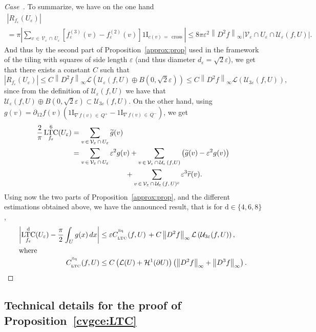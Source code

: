 \documentclass[10pt]{amsart}
\theoremstyle{definition}\newtheorem{defi}[theo]{Definition}\newtheorem{rema}[theo]{Remark}\newtheorem{exam}[theo]{Example}\newtheorem{exem}[theo]{Example}\newtheorem{nota}[theo]{Notation}
\newcommand{\ind}{{1\!\!\mathrm{I}}}
\newcommand{\eps}{\varepsilon}
\DeclareMathOperator{\LTC}{LTC}
\newcommand{\dd}{\mathrm{d}}
\DeclareMathOperator{\Sq}{Sq}
\DeclareMathOperator{\cross}{cross}
\newcommand{\calH}{\mathcal{H}}
\newcommand{\calL}{\mathcal{L}}
\newcommand{\calV}{\mathcal{V}}
\newcommand{\calU}{\mathcal{U}}
\newcounter{casecount}
\newenvironment{lastcase}{\refstepcounter{casecount}\begin{proof}[Case~\thecasecount]}{\end{proof}}
\let\oldtilde\tilde
\renewcommand*{\tilde}[1]{\mathchoice{\widetilde{#1}}{\widetilde{#1}}{\oldtilde{#1}}{\oldtilde{#1}}}
\begin{document}
\begin{lastcase}
To summarize, we have on the one hand
\begin{multline*}
\left| R_{f_\eps}(U_\eps)\right|\\
= \pi \left| \sum_{v\,\in\,\calV_\eps\,\cap\,U_\eps}
\left[f_\eps^{(3)}(v) - f_\eps^{(2)}(v)\right] \ind_{c(v)\,=\,\cross} \right| \leq 8 \pi \eps^2 \left\|D^2 f\right\|_\infty \left| \calV_\eps\cap U_\eps\cap\calU_{\eps}(f,U) \right|.
\end{multline*}
And thus by the second part of Proposition~\ref{approx:prop} used in the framework of the tiling with squares of side length $\eps$ (and thus diameter $d_\eps=\sqrt{2}\eps$), we get that there exists a constant $C$ such that
\[
\left| R_{f_\eps}(U_\eps) \right|\leq C \left\|D^2 f\right\|_\infty \calL \left(\calU_{\eps}(f,U) \oplus B\left(0,\sqrt{2}\eps\right)\right) \leq C \left\|D^2 f\right\|_\infty
\calL \left(\calU_{3\eps}(f,U)\right),
\]
since from the definition of $\calU_{\eps}(f,U)$ we have that $\calU_{\eps}(f,U) \oplus B(0,\sqrt{2}\eps) \subset \calU_{3\eps}(f,U)$. On the other hand, using $g(v)=\partial_{12} f(v)(\ind_{\nabla\,f(v)\,\in\,Q^+} -\ind_{\nabla\,f(v) \,\in\,Q^-})$, we get
\begin{align*}
\frac{2}{\pi} \LTC^6_{f_\eps}(U_\eps) & = \sum_{v\,\in\,\calV_\varepsilon\,\cap\,U_\eps} \tilde{g}(v) \\
& = \sum_{v\,\in\,\calV_\varepsilon\,\cap\,U_\eps} \eps^2 g(v) + \sum_{v\,\in\,\calV_\varepsilon\,\cap\,\calU_{\eps}\,(f,U)} \left(\tilde{g}(v) -\eps^2 g(v) \right)\\
& \mkern135mu + \sum_{v\,\in\,\calV_\varepsilon\,\cap\,\calU_{\eps}\,(f,\,U)^c} \eps^3 \tilde{r}(v).
\end{align*}
Using now the two parts of Proposition~\ref{approx:prop}, and the different estimations obtained above, we have the announced result, that is for $\dd\in\{4,6,8\}$,
\begin{align*}
\left| \LTC^{\dd}_{f_\eps}(U_\eps) - \frac{\pi}{2}\int_U g(x) \, dx
\right| &\leq \eps C_{_{\LTC}}^{^{\Sq}}(f,U)\, + C \left\|D^2 f\right\|_\infty \calL\left(\calU_{3\eps}(f,U)\right),
\\
\intertext{where}
C_{_{\LTC}}^{^{\Sq}}(f,U) & \le C\left(\calL(U)+\calH^1(\partial U)\right)\left(\left\|D^2f\right\|_\infty+\left\|D^3f\right\|_\infty\right).\qedhere
\end{align*}
\end{lastcase}


\subsection{Technical details for the proof of Proposition~\ref{cvgce:LTC}}\label{cvLTC:app}
\end{document}
